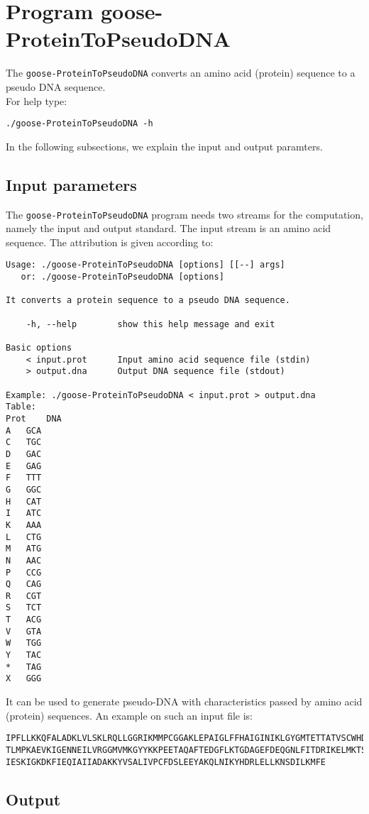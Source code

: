 \section{Program goose-ProteinToPseudoDNA}

The \texttt{goose-ProteinToPseudoDNA} converts an amino acid (protein) sequence to a pseudo DNA sequence.\\
For help type:
\begin{lstlisting}
./goose-ProteinToPseudoDNA -h
\end{lstlisting}
In the following subsections, we explain the input and output paramters.

\subsection*{Input parameters}

The \texttt{goose-ProteinToPseudoDNA} program needs two streams for the computation,
namely the input and output standard. The input stream is an amino acid sequence.
The attribution is given according to:
\begin{lstlisting}
Usage: ./goose-ProteinToPseudoDNA [options] [[--] args]
   or: ./goose-ProteinToPseudoDNA [options]

It converts a protein sequence to a pseudo DNA sequence.

    -h, --help        show this help message and exit

Basic options
    < input.prot      Input amino acid sequence file (stdin)
    > output.dna      Output DNA sequence file (stdout)

Example: ./goose-ProteinToPseudoDNA < input.prot > output.dna
Table:
Prot	DNA
A	GCA
C	TGC
D	GAC
E	GAG
F	TTT
G	GGC
H	CAT
I	ATC
K	AAA
L	CTG
M	ATG
N	AAC
P	CCG
Q	CAG
R	CGT
S	TCT
T	ACG
V	GTA
W	TGG
Y	TAC
*	TAG
X	GGG
\end{lstlisting}
It can be used to generate pseudo-DNA with characteristics passed by amino acid (protein) sequences. An example on such an input file is:
\begin{lstlisting}
IPFLLKKQFALADKLVLSKLRQLLGGRIKMMPCGGAKLEPAIGLFFHAIGINIKLGYGMTETTATVSCWHDFQFNPNSIG
TLMPKAEVKIGENNEILVRGGMVMKGYYKKPEETAQAFTEDGFLKTGDAGEFDEQGNLFITDRIKELMKTSNGKYIAPQY
IESKIGKDKFIEQIAIIADAKKYVSALIVPCFDSLEEYAKQLNIKYHDRLELLKNSDILKMFE
\end{lstlisting}

\subsection*{Output}

